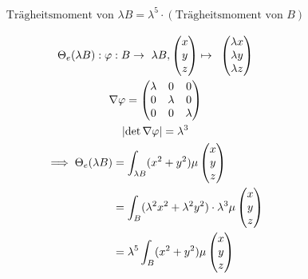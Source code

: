 \begin{bsp*}[note = Kugel]
\begin{gather*}
		\text{Trägheitsmoment von } \lambda B = \lambda^5 \cdot ( \text{Trägheitsmoment von } B )
	\end{gather*}
	\begin{bew}
		\begin{gather*}
			\Theta_e(\lambda B) : \varphi : B \rightarrow \lambda B , \begin{pmatrix} x \\ y \\ z \end{pmatrix} \mapsto \begin{pmatrix} \lambda x \\ \lambda y \\ \lambda z \end{pmatrix} \\
			\nabla \varphi = \begin{pmatrix} \lambda & 0 & 0 \\ 0 & \lambda & 0 \\ 0 & 0 & \lambda \end{pmatrix} \\
			\abs{\det \nabla \varphi} = \lambda^3 \\
			\begin{split}
				\implies \Theta_e(\lambda B)
					&= \int_{\lambda B} (x^2 + y^2) \mu\begin{pmatrix} x \\ y \\ z \end{pmatrix} \\
					&= \int_B (\lambda^2 x^2 + \lambda^2 y^2) \cdot \lambda^3 \mu\begin{pmatrix} x \\ y \\ z \end{pmatrix} \\
					&= \lambda^5 \int_B (x^2 + y^2) \mu\begin{pmatrix} x \\ y \\ z \end{pmatrix}
			\end{split}
		\end{gather*}
	\end{bew}
\end{bsp*}
